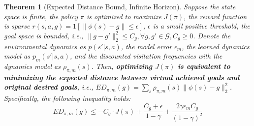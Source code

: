 \documentclass{article}
\newtheorem{theorem}{Theorem}
\begin{document}
\begin{theorem}[Expected Distance Bound, Infinite Horizon]
\label{tm:expected_distance}
    Suppose the state space is finite, the policy $\pi$ is optimized to maximize $J(\pi)$, the reward function is sparse $r(s,a,g)=1[\|\phi(s)-g\| \leq \epsilon]$, $\epsilon$ is a small positive threshold, the goal space is bounded, i.e., $\|g-g'\|_2^2 \leq C_g, \forall g,g' \in \mathcal{G}, C_g \geq 0$. Denote the environmental dynamics as $p(s'|s,a)$, the model error $\epsilon_m$, the learned dynamics model as $p_m(s'|s,a)$, and the discounted visitation frequencies with the dynamics model as $\rho_{\pi,m}(s)$. Then, \textbf{optimizing $J(\pi)$ is equivalent to minimizing the expected distance between virtual achieved goals and original desired goals}, i.e., $ED_{\pi,m}(g)=\sum_s \rho_{\pi, m}(s) \|\phi(s)-g\|_2^2$. Specifically, the following inequality holds:
    \begin{equation*}
        ED_{\pi,m}(g) \leq -C_g \cdot J(\pi) +  \frac{C_g+\epsilon}{1-\gamma} + \frac{2\gamma \epsilon_m C_g}{(1-\gamma)^2}
    \end{equation*}
\end{theorem}
\end{document}
